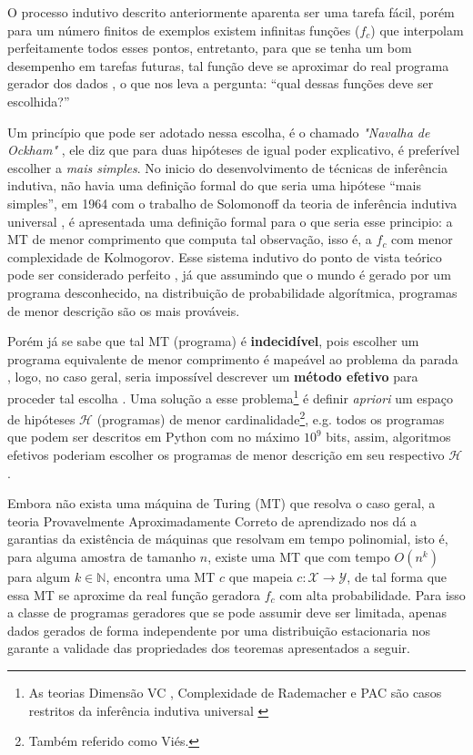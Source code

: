 O processo indutivo descrito anteriormente aparenta ser uma tarefa fácil, porém
para um número finitos de exemplos existem infinitas funções ($f_c$) que
interpolam perfeitamente todos esses
pontos\cite{bishop2006pattern,abu2012learning}, entretanto, para que se tenha
um bom desempenho em tarefas futuras, tal função deve se aproximar do real
programa gerador dos dados
\cite{mohri2018foundations,goodfellow2016deep,solomonoff1964formal,kearns1994introduction},
o que nos leva a pergunta: ``qual dessas funções deve ser escolhida?''

Um princípio que pode ser adotado nessa escolha, é o chamado \textit{"Navalha
de Ockham"} \cite{blumer1987occam}, ele diz que para duas hipóteses de igual
poder explicativo, é preferível escolher a \textit{mais simples}. No inicio do
desenvolvimento de técnicas de inferência indutiva, não havia uma definição
formal do que seria uma hipótese ``mais simples'', em 1964 com o trabalho de
Solomonoff da teoria de inferência indutiva universal
\cite{solomonoff1964formal}, é apresentada uma definição formal para o que
seria esse principio: a MT de menor comprimento que computa tal observação,
isso é, a $f_c$ com menor complexidade de Kolmogorov. Esse sistema indutivo do
ponto de vista teórico pode ser considerado perfeito \cite{li1992inductive}, já
que assumindo que o mundo é gerado por um programa desconhecido, na
distribuição de probabilidade algorítmica, programas de menor descrição são os
mais prováveis.

Porém já se sabe que tal MT (programa) é \textbf{indecidível}, pois escolher um
programa equivalente de menor comprimento é mapeável ao problema da parada
\cite{sipser2012introduction,solomonoff1978complexity}, logo, no caso geral,
seria impossível descrever um \textbf{método efetivo} para proceder tal escolha
\cite{hutter2004universal}. Uma solução a esse problema\footnote{As teorias
Dimensão VC \cite{vapnik2013nature}, Complexidade de Rademacher
\cite{bartlett2002rademacher} e PAC \cite{valiant1984theory} são casos
restritos da inferência indutiva universal
\cite{li1992inductive,blumer1989learnability}} é definir \textit{apriori} um
espaço de hipóteses $\mathcal{H}$ (programas) de menor
cardinalidade\footnote{Também referido como Viés.}, e.g. todos os programas que
podem ser descritos em Python com no máximo $10^9$ bits, assim, algoritmos
efetivos poderiam escolher os programas de menor descrição em seu respectivo
$\mathcal{H}$ \cite{rathmanner2011philosophical}.

Embora não exista uma máquina de Turing (MT) que resolva o caso geral, a teoria
Provavelmente Aproximadamente Correto de aprendizado nos dá a garantias da
existência de máquinas que resolvam em tempo polinomial, isto é, para alguma
amostra de tamanho $n$, existe uma MT que com tempo $O(n^k)$ para algum $k \in
\mathbb{N}$, encontra uma MT $c$ que mapeia
$c:\mathcal{X}\rightarrow\mathcal{Y}$, de tal forma que essa MT se aproxime da
real função geradora $f_c$ com alta probabilidade. Para isso a classe de
programas geradores que se pode assumir deve ser limitada, apenas dados gerados
de forma independente por uma distribuição estacionaria nos garante a validade
das propriedades dos teoremas apresentados a seguir.


